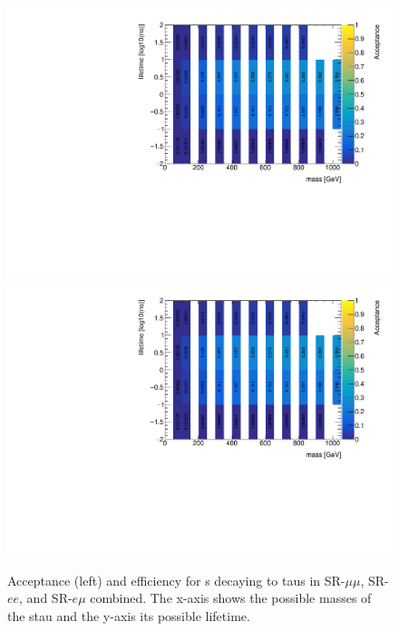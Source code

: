 \begin{figure}[htbp]
\centering
\includegraphics[width=.48\textwidth]{figures/event_selection/mm_slep_acc.pdf}
\includegraphics[width=.48\textwidth]{figures/event_selection/mm_slep_acc.pdf}
\caption{Acceptance (left) and efficiency for \stau s decaying to taus in SR-$\mu\mu$, SR-$ee$, and SR-$e\mu$ combined. The x-axis shows the possible masses of the stau and the y-axis its possible lifetime.}
\label{fig:acc-eff-em}
\end{figure}




